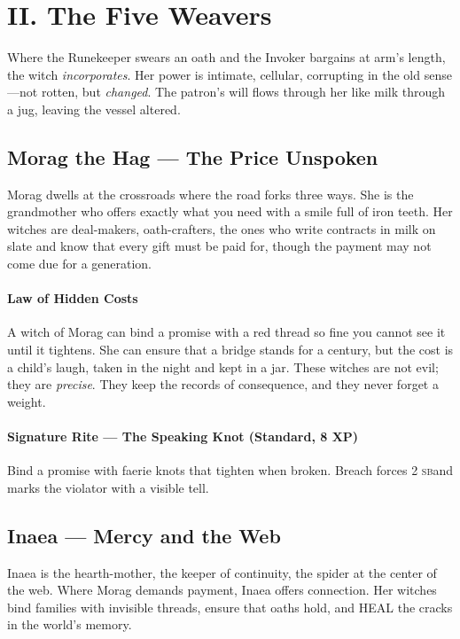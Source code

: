 \documentclass[11pt,letterpaper]{article}
\newcommand{\sbmark}{\textsc{sb}}
\begin{document}
\section{II. The Five Weavers}

Where the Runekeeper swears an oath and the Invoker bargains at arm's length, the witch \textit{incorporates}. Her power is intimate, cellular, corrupting in the old sense---not rotten, but \textit{changed}. The patron's will flows through her like milk through a jug, leaving the vessel altered.

\subsection{Morag the Hag --- The Price Unspoken}

Morag dwells at the crossroads where the road forks three ways. She is the grandmother who offers exactly what you need with a smile full of iron teeth. Her witches are deal-makers, oath-crafters, the ones who write contracts in milk on slate and know that every gift must be paid for, though the payment may not come due for a generation.

\paragraph{Law of Hidden Costs} A witch of Morag can bind a promise with a red thread so fine you cannot see it until it tightens. She can ensure that a bridge stands for a century, but the cost is a child's laugh, taken in the night and kept in a jar. These witches are not evil; they are \textit{precise}. They keep the records of consequence, and they never forget a weight.

\paragraph{Signature Rite --- The Speaking Knot (Standard, 8 XP)}
Bind a promise with faerie knots that tighten when broken. Breach forces 2 \sbmark and marks the violator with a visible tell.

\subsection{Inaea --- Mercy and the Web}

Inaea is the hearth-mother, the keeper of continuity, the spider at the center of the web. Where Morag demands payment, Inaea offers connection. Her witches bind families with invisible threads, ensure that oaths hold, and HEAL the cracks in the world's memory.
\end{document}
